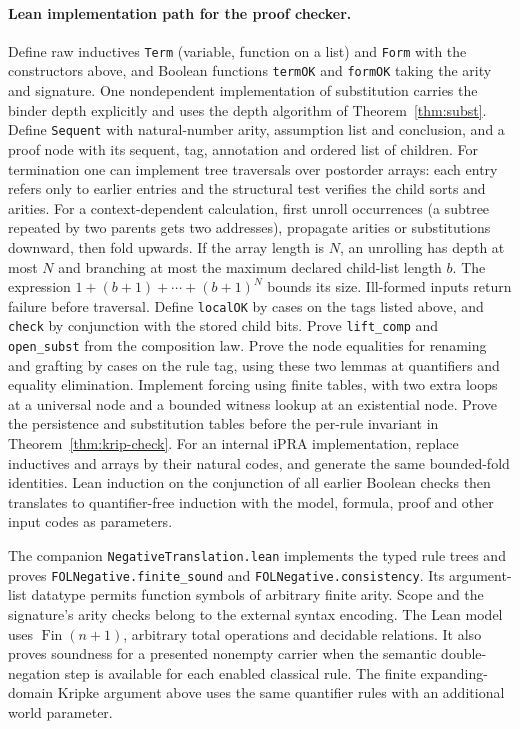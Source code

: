 \paragraph{Lean implementation path for the proof checker.}
Define raw inductives \texttt{Term} (variable, function on a list)
and \texttt{Form} with the constructors above, and Boolean functions
\texttt{termOK} and \texttt{formOK} taking the arity and signature.
One nondependent implementation of substitution carries the binder
depth explicitly and uses the depth algorithm of
Theorem~\ref{thm:subst}. Define \texttt{Sequent} with natural-number
arity, assumption list and conclusion, and a proof node with its sequent,
tag, annotation and ordered list of children. For termination one can
implement tree traversals over postorder arrays: each entry refers only
to earlier entries and the structural test verifies the child sorts and
arities. For a context-dependent calculation, first unroll occurrences
(a subtree repeated by two parents gets two addresses), propagate
arities or substitutions downward, then fold upwards. If the array length
is $N$, an unrolling has depth at most $N$ and branching at most the
maximum declared child-list length $b$. The expression $1+(b+1)+\cdots+(b+1)^N$
bounds its size. Ill-formed inputs return failure before traversal.
Define \texttt{localOK} by cases on the tags listed above, and
\texttt{check} by conjunction with the stored child bits. Prove
\texttt{lift\_comp} and \texttt{open\_subst} from the composition
law. Prove the node equalities for renaming and grafting by cases
on the rule tag, using these two lemmas at quantifiers and equality
elimination. Implement forcing using finite tables, with two extra
loops at a universal node and a bounded witness lookup at an existential
node. Prove the persistence and substitution tables before the
per-rule invariant in Theorem~\ref{thm:krip-check}. For an internal
iPRA implementation, replace inductives and arrays by their natural
codes, and generate the same bounded-fold identities. Lean induction on
the conjunction of all earlier Boolean checks then translates to
quantifier-free induction with the model, formula, proof and other
input codes as parameters.

The companion \texttt{NegativeTranslation.lean} implements the typed
rule trees and proves \texttt{FOLNegative.finite\_sound} and
\texttt{FOLNegative.consistency}. Its argument-list datatype permits
function symbols of arbitrary finite arity. Scope and the signature's
arity checks belong to the external syntax encoding. The Lean model
uses $\operatorname{Fin}(n+1)$, arbitrary total operations and decidable
relations. It also proves soundness for a presented nonempty carrier
when the semantic double-negation step is available for each enabled
classical rule. The finite expanding-domain Kripke argument above uses
the same quantifier rules with an additional world parameter.
